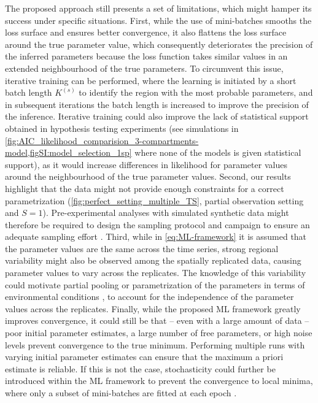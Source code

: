 The proposed approach still presents a set of limitations, which might hamper its success under specific situations. 
% 
First, while the use of mini-batches smooths the loss surface and ensures better convergence, it also flattens the loss surface around the true parameter value, which consequently deteriorates the precision of the inferred parameters because the loss function takes similar values in an extended neighbourhood of the true parameters. 
To circumvent this issue, iterative training can be performed, where the learning is initiated by a short batch length $K^{(s)}$ to identify the region with the most probable parameters, and in subsequent iterations the batch length is increased to improve the precision of the inference. 
% 
Iterative training could also improve the lack of statistical support obtained in hypothesis testing experiments (see simulations in \cref{fig:AIC_likelihood_comparision_3-compartments-model,figSI:model_selection_1sp} where none of the models is given statistical support), as it would increase differences in likelihood for parameter values around the neighbourhood of the true parameter values.
% 
Second, our results highlight that the data might not provide enough constraints for a correct parametrization (\cref{fig:perfect_setting_multiple_TS}, partial observation setting and $S=1$). Pre-experimental analyses with simulated synthetic data might therefore be required to design the sampling protocol and campaign to ensure an adequate sampling effort \cite{Banks2017,Laubmeier2018}. %
%
Third, while in \cref{eq:ML-framework} it is assumed that the parameter values are the same across the time series, strong regional variability might also be observed among the spatially replicated data, causing parameter values to vary across the replicates. The knowledge of this variability could motivate partial pooling \cite{Beaumont2010} or parametrization of the parameters in terms of environmental conditions \cite{Pahlow2008}, to account for the independence of the parameter values across the replicates.
%
Finally, while the proposed ML framework greatly improves convergence, it could still be that -- even with a large amount of data -- poor initial parameter estimates, a large number of free parameters, or high noise levels prevent convergence to the true minimum. Performing multiple runs with varying initial parameter estimates can ensure that the maximum a priori estimate is reliable. If this is not the case, stochasticity could further be introduced within the ML framework to prevent the convergence to local minima, where only a subset of mini-batches are fitted at each epoch \cite{bottou2012stochastic}.

